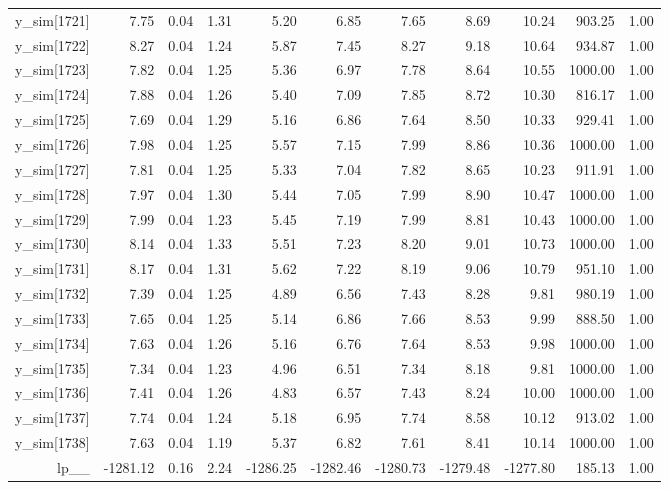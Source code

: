 \begin{table}[ht]
\begin{tabular}{rrrrrrrrrrr}
  y\_sim[1721] & 7.75 & 0.04 & 1.31 & 5.20 & 6.85 & 7.65 & 8.69 & 10.24 & 903.25 & 1.00 \\ 
  y\_sim[1722] & 8.27 & 0.04 & 1.24 & 5.87 & 7.45 & 8.27 & 9.18 & 10.64 & 934.87 & 1.00 \\ 
  y\_sim[1723] & 7.82 & 0.04 & 1.25 & 5.36 & 6.97 & 7.78 & 8.64 & 10.55 & 1000.00 & 1.00 \\ 
  y\_sim[1724] & 7.88 & 0.04 & 1.26 & 5.40 & 7.09 & 7.85 & 8.72 & 10.30 & 816.17 & 1.00 \\ 
  y\_sim[1725] & 7.69 & 0.04 & 1.29 & 5.16 & 6.86 & 7.64 & 8.50 & 10.33 & 929.41 & 1.00 \\ 
  y\_sim[1726] & 7.98 & 0.04 & 1.25 & 5.57 & 7.15 & 7.99 & 8.86 & 10.36 & 1000.00 & 1.00 \\ 
  y\_sim[1727] & 7.81 & 0.04 & 1.25 & 5.33 & 7.04 & 7.82 & 8.65 & 10.23 & 911.91 & 1.00 \\ 
  y\_sim[1728] & 7.97 & 0.04 & 1.30 & 5.44 & 7.05 & 7.99 & 8.90 & 10.47 & 1000.00 & 1.00 \\ 
  y\_sim[1729] & 7.99 & 0.04 & 1.23 & 5.45 & 7.19 & 7.99 & 8.81 & 10.43 & 1000.00 & 1.00 \\ 
  y\_sim[1730] & 8.14 & 0.04 & 1.33 & 5.51 & 7.23 & 8.20 & 9.01 & 10.73 & 1000.00 & 1.00 \\ 
  y\_sim[1731] & 8.17 & 0.04 & 1.31 & 5.62 & 7.22 & 8.19 & 9.06 & 10.79 & 951.10 & 1.00 \\ 
  y\_sim[1732] & 7.39 & 0.04 & 1.25 & 4.89 & 6.56 & 7.43 & 8.28 & 9.81 & 980.19 & 1.00 \\ 
  y\_sim[1733] & 7.65 & 0.04 & 1.25 & 5.14 & 6.86 & 7.66 & 8.53 & 9.99 & 888.50 & 1.00 \\ 
  y\_sim[1734] & 7.63 & 0.04 & 1.26 & 5.16 & 6.76 & 7.64 & 8.53 & 9.98 & 1000.00 & 1.00 \\ 
  y\_sim[1735] & 7.34 & 0.04 & 1.23 & 4.96 & 6.51 & 7.34 & 8.18 & 9.81 & 1000.00 & 1.00 \\ 
  y\_sim[1736] & 7.41 & 0.04 & 1.26 & 4.83 & 6.57 & 7.43 & 8.24 & 10.00 & 1000.00 & 1.00 \\ 
  y\_sim[1737] & 7.74 & 0.04 & 1.24 & 5.18 & 6.95 & 7.74 & 8.58 & 10.12 & 913.02 & 1.00 \\ 
  y\_sim[1738] & 7.63 & 0.04 & 1.19 & 5.37 & 6.82 & 7.61 & 8.41 & 10.14 & 1000.00 & 1.00 \\ 
  lp\_\_ & -1281.12 & 0.16 & 2.24 & -1286.25 & -1282.46 & -1280.73 & -1279.48 & -1277.80 & 185.13 & 1.00 \\ 
   \hline
\end{tabular}
\end{table}
